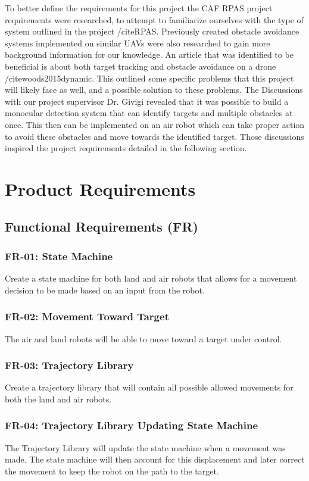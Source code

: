 \documentclass[]{report}
\begin{document}
To better define the requirements for this project the CAF RPAS project requirements were researched, to attempt to familiarize ourselves with the type of system outlined in the project /cite{RPAS}. Previously created obstacle avoidance systems implemented on similar UAVs were also researched to gain more background information for our knowledge. An article that was identified to be beneficial is about both target tracking and obstacle avoidance on a drone /cite{woods2015dynamic}. This outlined some specific problems that this project will likely face as well, and a possible solution to these problems. 
The Discussions with our project supervisor Dr. Givigi revealed that it was possible to build a monocular detection system that can identify targets and multiple obstacles at once. This then can be implemented on an air robot which can take proper action to avoid these obstacles and move towards the identified target. Those discussions inspired the project requirements detailed in the following section.


\chapter{Product Requirements}

\section{Functional Requirements (FR)}

\subsection{FR-01: State Machine}
Create a state machine for both land and air robots that allows for a movement decision to be made based on an input from the robot. 

\subsection{FR-02: Movement Toward Target}
The air and land robots will be able to move toward a target under control.

\subsection{FR-03: Trajectory Library}
Create a trajectory library that will contain all possible allowed movements for both the land and air robots.

\subsection{FR-04: Trajectory Library Updating State Machine}
The Trajectory Library will update the state machine when a movement was made. The state machine will then account for this displacement and later correct the movement to keep the robot on the path to the target.
\end{document}
